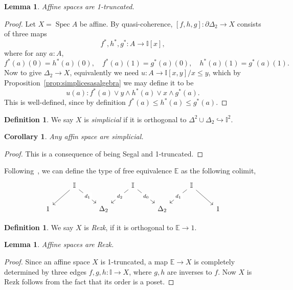 \documentclass[12pt]{amsart}
\newtheorem{lemma}[theorem]{Lemma}
\newtheorem{corollary}[theorem]{Corollary}
\theoremstyle{definition}
\newtheorem{definition}[theorem]{Definition}
\newcommand{\mbb}[1]{\mathbb{#1}}
\newcommand{\I}{\mbb I}
\newcommand{\hook}{\hookrightarrow}
\newcommand{\spec}{\operatorname{Spec}}
\begin{document}
\begin{lemma}
  Affine spaces are 1-truncated.
\end{lemma}
\begin{proof}
  Let $X = \spec A$ be affine. By quasi-coherence, $[f,h,g] : \partial\Delta_2 \to X$ consists of three maps
  \[ f^*,h^*,g^* : A \to \I[x], \]
  where for any $a : A$,
  \[ f^*(a)(0) = h^*(a)(0), \quad f^*(a)(1) = g^*(a)(0), \quad h^*(a)(1) = g^*(a)(1). \]
  Now to give $\Delta_2 \to X$, equivalently we need $u : A \to \I[x,y]/x \le y$, which by Proposition~\ref{prop:simplicesasalgebra} we may define it to be
  \[ u(a) : f^*(a) \vee y \wedge h^*(a) \vee x \wedge g^*(a). \]
  This is well-defined, since by definition $f^*(a) \le h^*(a) \le g^*(a)$. 
\end{proof}

\begin{definition}
  We say $X$ is \emph{simplicial} if it is orthogonal to $\Delta^2 \cup \Delta_2 \hook \I^2$.
\end{definition}

\begin{corollary}
  Any affin space are simplicial.
\end{corollary}
\begin{proof}
  This is a consequence of being Segal and 1-truncated.
\end{proof}

 

Following~\cite{buchholtz2021synthetic}, we can define the type of free equivalence $\mbb E$ as the following colimit,
\[
\begin{tikzcd}
	& \I && \I && \I \\
	1 && {\Delta_2} && {\Delta_2} && 1
	\arrow[from=1-2, to=2-1]
	\arrow["{d_1}"{description}, from=1-2, to=2-3]
	\arrow["{d_2}"{description}, from=1-4, to=2-3]
	\arrow["{d_0}"{description}, from=1-4, to=2-5]
	\arrow["{d_1}"{description}, from=1-6, to=2-5]
	\arrow[from=1-6, to=2-7]
\end{tikzcd}
\]

\begin{definition}
  We say $X$ is \emph{Rezk}, if it is orthogonal to $\mbb E \to 1$.
\end{definition}

\begin{lemma}
  Affine spaces are Rezk.
\end{lemma}
\begin{proof}
  Since an affine space $X$ is 1-truncated, a map $\mbb E \to X$ is completely determined by three edges $f,g,h : \I \to X$, where $g,h$ are inverses to $f$. Now $X$ is Rezk follows from the fact that its order is a poset.
\end{proof}
\end{document}
